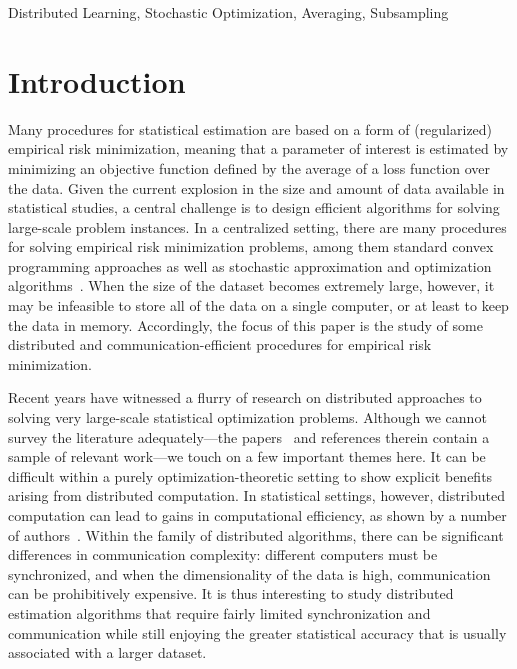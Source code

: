\documentclass[11pt,twoside]{article}
\def\jmlr{1}
\theoremstyle{definition}
\begin{document}
\ifdefined\jmlr
\begin{keywords}
  Distributed Learning, Stochastic Optimization,
  Averaging, Subsampling
\end{keywords}
\else
\fi


\section{Introduction}

Many procedures for statistical estimation are based on a form of
(regularized) empirical risk minimization, meaning that a parameter of
interest is estimated by minimizing an objective function defined by
the average of a loss function over the data.  Given the current
explosion in the size and amount of data available in statistical
studies, a central challenge is to design efficient algorithms for
solving large-scale problem instances.  In a centralized setting,
there are many procedures for solving empirical risk minimization
problems, among them standard convex programming approaches
\citep[e.g.][]{BoydVa04} as well as stochastic approximation and
optimization algorithms~\citep{RobbinsMo51, HazanKaKaAg06,
  NemirovskiJuLaSh09}.  When the size of the dataset becomes extremely
large, however, it may be infeasible to store all of the data on a
single computer, or at least to keep the data in memory.  Accordingly,
the focus of this paper is the study of some distributed and
communication-efficient procedures for empirical risk minimization.


Recent years have witnessed a flurry of research on distributed
approaches to solving very large-scale statistical optimization
problems.  Although we cannot survey the literature adequately---the
papers~\citet{NedicOz09, RamNeVe10, JohanssonRaJo09,
  DuchiAgWa12, DekelGiShXi12, AgarwalDu11, RechtReWrNi11, DuchiBaWa12}
and references therein contain a sample of relevant work---we touch on
a few important themes here. It can be difficult within a purely
optimization-theoretic setting to show explicit benefits arising from
distributed computation. In statistical settings, however, distributed
computation can lead to gains in computational efficiency, as shown by a
number of authors~\citep{AgarwalDu11, DekelGiShXi12, RechtReWrNi11,
  DuchiBaWa12}.  Within the family of distributed algorithms, there
can be significant differences in communication complexity: different
computers must be synchronized, and when the dimensionality of the
data is high, communication can be prohibitively expensive. It is thus
interesting to study distributed estimation algorithms that require
fairly limited synchronization and communication while still enjoying
the greater statistical accuracy that is usually associated
with a larger dataset.
\end{document}
